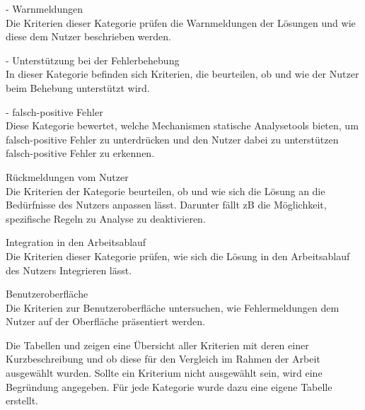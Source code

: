 \begin{description}
    \setlength\itemsep{-0.5cm}
    \item[Kategorie 1]{- Warnmeldungen\\}
          Die Kriterien dieser Kategorie prüfen die Warnmeldungen der Lösungen und wie diese dem Nutzer beschrieben werden.
    \item[Kategorie 2]{- Unterstützung bei der Fehlerbehebung\\}
          In dieser Kategorie befinden sich Kriterien, die beurteilen, ob und wie der Nutzer beim Behebung unterstützt wird.
    \item[Kategorie 3]{- falsch-positive Fehler\\}
          Diese Kategorie bewertet, welche Mechanismen statische Analysetools bieten, um falsch-positive Fehler zu unterdrücken
          und den Nutzer dabei zu unterstützen falsch-positive Fehler zu erkennen.
    \item[Kategorie 4]{Rückmeldungen vom Nutzer\\}
          Die Kriterien der Kategorie beurteilen, ob und wie sich die Lösung an die Bedürfnisse des Nutzers anpassen lässt.
          Darunter fällt \ac{zB} die Möglichkeit, spezifische Regeln zu Analyse zu deaktivieren.
    \item[Kategorie 5]{Integration in den Arbeitsablauf\\}
          Die Kriterien dieser Kategorie prüfen, wie sich die Lösung in den Arbeitsablauf des Nutzers Integrieren lässt.
    \item[Kategorie 6]{Benutzeroberfläche\\}
          Die Kriterien zur Benutzeroberfläche untersuchen, wie Fehlermeldungen dem Nutzer auf der Oberfläche präsentiert werden.
\end{description}

Die Tabellen   und zeigen eine Übersicht aller Kriterien mit deren einer Kurzbeschreibung und ob diese für den Vergleich im Rahmen der Arbeit ausgewählt wurden.
Sollte ein Kriterium nicht ausgewählt sein, wird eine Begründung angegeben. Für jede Kategorie wurde dazu eine eigene Tabelle erstellt.

